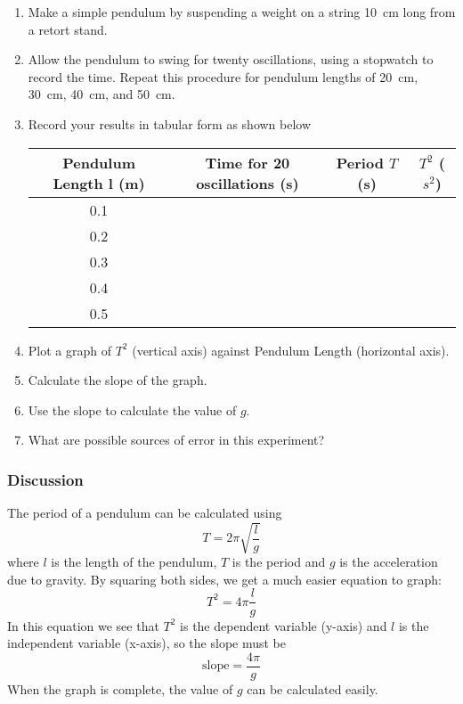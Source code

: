 \begin{enumerate}
\item{Make a simple pendulum by suspending a weight on a string 10~cm long from a retort
stand.}
\item{Allow the pendulum to swing for twenty oscillations, using a stopwatch to record the
time. Repeat this procedure for pendulum lengths of 20~cm, 30~cm, 40~cm, and 50~cm.}
\item{Record your results in tabular form as shown below}

\begin{center}
\begin{tabular}{ | c | c | c | c | }
\hline
Pendulum Length l (m) & Time for 20 oscillations (s) & Period $T$ (s) & $T^2$ ($s^2$) \\ \hline
0.1 & & & \\ \hline
0.2 & & & \\ \hline
0.3 & & & \\ \hline
0.4 & & & \\ \hline
0.5 & & & \\ \hline
\end{tabular}
\end{center}

\item{Plot a graph of $T^2$ (vertical axis) against Pendulum Length (horizontal axis).}
\item{Calculate the slope of the graph.}
\item{Use the slope to calculate the value of $g$.}
\item{What are possible sources of error in this experiment?}

\end{enumerate}

\subsubsection{Discussion}

The period of a pendulum can be calculated using $$T = 2\pi\sqrt{\frac{l}{g}}$$
where $l$ is the length of the pendulum, $T$ is the period and $g$ is the acceleration due to
gravity. By squaring both sides, we get a much easier equation to graph: $$T^2 = 4\pi\frac{l}{g}$$ In this equation we see that $T^2$ is the dependent variable (y-axis) and $l$ is the
independent variable (x-axis), so the slope must be $$\mathrm{slope} = \frac{4\pi}{g}$$ 
When the graph is complete, the value of $g$ can be calculated easily.

